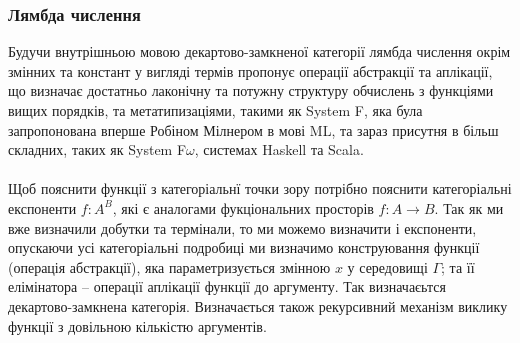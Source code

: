 \documentclass[11pt,oneside]{article}
\begin{document}
\newpage
   \subsubsection{Лямбда числення}
   Будучи внутрішньою мовою декартово-замкненої категорії лямбда числення окрім змінних
   та констант у вигляді термів пропонує операції абстракції та аплікації, що визначає
   достатньо лаконічну та потужну структуру обчислень з функціями вищих порядків,
   та метатипизаціями, такими як System F, яка була запропонована
   вперше Робіном Мілнером в мові ML, та зараз присутня в більш складних,
   таких як System F$\omega$, системах Haskell та Scala.

   \paragraph{}
   Щоб пояснити функції з категоріальнї точки зору потрібно пояснити категоріальні
   експоненти $f : A^B$,  які є аналогами фукціональних просторів $f: A \rightarrow B$.
   Так як ми вже визначили добутки та термінали, то ми можемо визначити і експоненти,
   опускаючи усі категоріальні подробиці ми визначимо конструювання функції (операція абстракції),
   яка параметризується змінною $x$ у середовищі $\Gamma$; та її елімінатора -- операції аплікації
   функції до аргументу. Так визначаєьтся декартово-замкнена категорія.
   Визначається також рекурсивний механізм виклику функції
   з довільною кількістю аргументів.
\end{document}
